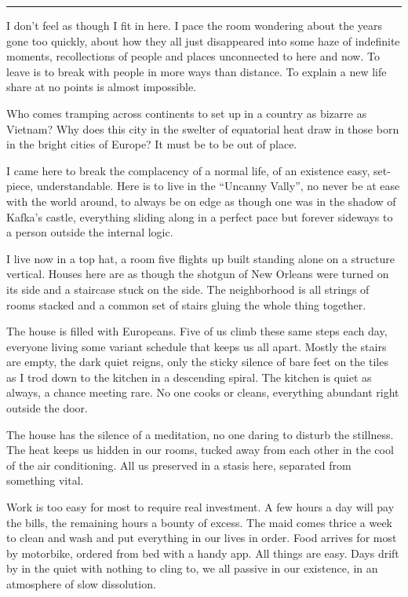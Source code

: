 \documentclass[ebook, 10pt, openright, onecolumn]{memoir}
\newcommand*\td[1]{
  \todo[inline]{
     #1 
  }
}
\newcommand*\starbreak{\fancybreak*{\Large{* * *}}}
\newcommand*\finish{\td{ ----- Finish this section -----}}
\begin{document}
\finish


\starbreak

I don't feel as though I fit in here. I pace the room wondering about the years
gone too quickly, about how they all just disappeared into some haze of
indefinite moments, recollections of people and places unconnected to here and
now.  To leave is to break with people in more ways than distance.  To explain a
new life share at no points is almost impossible.

Who comes tramping across continents to set up in a country as bizarre as
Vietnam?  Why does this city in the swelter of equatorial heat draw in those
born in the bright cities of Europe?  It must be to be out of place.

I came here to break the complacency of a normal life, of an existence easy,
set-piece, understandable.  Here is to live in the ``Uncanny Vally'', no never
be at ease with the world around, to always be on edge as though one was in the
shadow of Kafka's castle, everything sliding along in a perfect pace but forever
sideways to a person outside the internal logic.

I live now in a top hat, a room five flights up built standing alone on a
structure vertical.  Houses here are as though the shotgun of New Orleans were
turned on its side and a staircase stuck on the side.  The neighborhood is all
strings of rooms stacked and a common set of stairs gluing the whole thing
together.

The house is filled with Europeans.  Five of us climb these same steps each
day, everyone living some variant schedule that keeps us all apart.  Mostly the
stairs are empty, the dark quiet reigns, only the sticky silence of bare feet
on the tiles as I trod down to the kitchen in a descending spiral.  The kitchen
is quiet as always, a chance meeting rare.  No one cooks or cleans, everything
abundant right outside the door.

The house has the silence of a meditation, no one daring to disturb the
stillness.  The heat keeps us hidden in our rooms, tucked away from each other
in the cool of the air conditioning. All us preserved in a stasis here,
separated from something vital.

Work is too easy for most to require real investment.  A few hours a day will
pay the bills, the remaining hours a bounty of excess.  The maid comes thrice a
week to clean and wash and put everything in our lives in order.  Food arrives
for most by motorbike, ordered from bed with a handy app.  All things are easy.
Days drift by in the quiet with nothing to cling to, we all passive in our
existence, in an atmosphere of slow dissolution.
\end{document}
